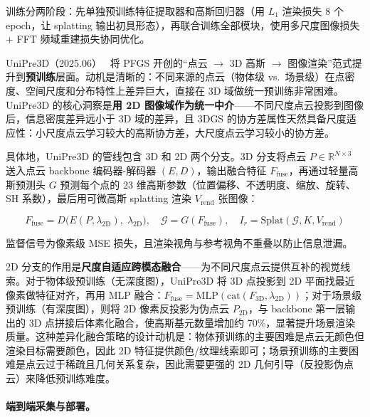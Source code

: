 训练分两阶段：先单独预训练特征提取器和高斯回归器（用 $L_1$ 渲染损失 8 个 epoch，让 splatting 输出初具形态），再联合训练全部模块，使用多尺度图像损失 + FFT 频域重建损失协同优化。

UniPre3D（2025.06）~\cite{2506_09952} 将 PFGS 开创的“点云 $\to$ 3D 高斯 $\to$ 图像渲染”范式提升到\textbf{预训练}层面。动机是清晰的：不同来源的点云（物体级 vs.\ 场景级）在点密度、空间尺度和分布特性上差异巨大，直接在 3D 域做统一预训练非常困难。UniPre3D 的核心洞察是\textbf{用 2D 图像域作为统一中介}——不同尺度点云投影到图像后，信息密度差异远小于 3D 域的差异，且 3DGS 的协方差属性天然具备尺度适应性：小尺度点云学习较大的高斯协方差，大尺度点云学习较小的协方差。

具体地，UniPre3D 的管线包含 3D 和 2D 两个分支。3D 分支将点云 $P \in \mathbb{R}^{N \times 3}$ 送入点云 backbone 编码器-解码器 $(E, D)$，输出融合特征 $F_\mathrm{fuse}$，再通过轻量高斯预测头 $G$ 预测每个点的 23 维高斯参数（位置偏移、不透明度、缩放、旋转、SH 系数），最后用可微高斯 splatting 渲染 $V_\mathrm{rend}$ 张图像：

\begin{equation}
F_\mathrm{fuse} = D\bigl(E(P, \lambda_\mathrm{2D}),\; \lambda_\mathrm{2D}\bigr), \quad \mathcal{G} = G(F_\mathrm{fuse}), \quad I_r = \mathrm{Splat}(\mathcal{G}, K, V_\mathrm{rend})
\end{equation}

监督信号为像素级 MSE 损失，且渲染视角与参考视角不重叠以防止信息泄漏。

2D 分支的作用是\textbf{尺度自适应跨模态融合}——为不同尺度点云提供互补的视觉线索。对于物体级预训练（无深度图），UniPre3D 将 3D 点投影到 2D 平面找最近像素做特征对齐，再用 MLP 融合：$F_\mathrm{fuse} = \mathrm{MLP}(\mathrm{cat}(F_\mathrm{3D}, \lambda_\mathrm{2D}))$；对于场景级预训练（有深度图），则将 2D 像素反投影为伪点云 $P_\mathrm{2D}$，与 backbone 第一层输出的 3D 点拼接后体素化融合，使高斯基元数量增加约 70\%，显著提升场景渲染质量。这种差异化融合策略的设计动机是：物体预训练的主要困难是点云无颜色但渲染目标需要颜色，因此 2D 特征提供颜色/纹理线索即可；场景预训练的主要困难是点云过于稀疏且几何关系复杂，因此需要更强的 2D 几何引导（反投影伪点云）来降低预训练难度。

\paragraph{端到端采集与部署。}


